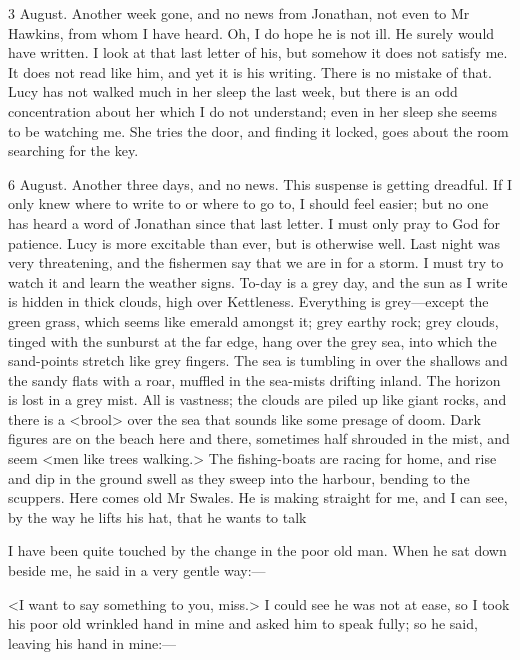 \begin{diary}{3 August.}
Another week gone, and no news from Jonathan, not even to Mr Hawkins, from whom I have heard. Oh, I do hope he is not ill. He surely would have written. I look at that last letter of his, but somehow it does not satisfy me. It does not read like him, and yet it is his writing. There is no mistake of that. Lucy has not walked much in her sleep the last week, but there is an odd concentration about her which I do not understand; even in her sleep she seems to be watching me. She tries the door, and finding it locked, goes about the room searching for the key.
\end{diary}

\begin{diary}{6 August.}
Another three days, and no news. This suspense is getting dreadful. If I only knew where to write to or where to go to, I should feel easier; but no one has heard a word of Jonathan since that last letter. I must only pray to God for patience. Lucy is more excitable than ever, but is otherwise well. Last night was very threatening, and the fishermen say that we are in for a storm. I must try to watch it and learn the weather signs. To-day is a grey day, and the sun as I write is hidden in thick clouds, high over Kettleness. Everything is grey—except the green grass, which seems like emerald amongst it; grey earthy rock; grey clouds, tinged with the sunburst at the far edge, hang over the grey sea, into which the sand-points stretch like grey fingers. The sea is tumbling in over the shallows and the sandy flats with a roar, muffled in the sea-mists drifting inland. The horizon is lost in a grey mist. All is vastness; the clouds are piled up like giant rocks, and there is a <brool> over the sea that sounds like some presage of doom. Dark figures are on the beach here and there, sometimes half shrouded in the mist, and seem <men like trees walking.> The fishing-boats are racing for home, and rise and dip in the ground swell as they sweep into the harbour, bending to the scuppers. Here comes old Mr Swales. He is making straight for me, and I can see, by the way he lifts his hat, that he wants to talk

I have been quite touched by the change in the poor old man. When he sat down beside me, he said in a very gentle way:—

<I want to say something to you, miss.> I could see he was not at ease, so I took his poor old wrinkled hand in mine and asked him to speak fully; so he said, leaving his hand in mine:—


\end{diary}
